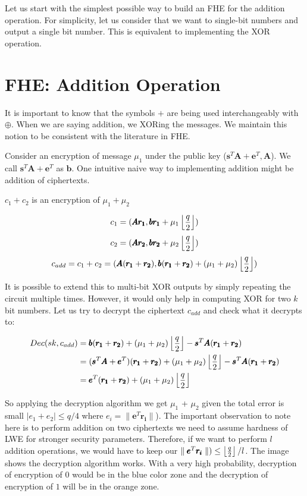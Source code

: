 \documentclass[usletter]{article}
\begin{document}
Let us start with the simplest possible way to build an FHE for the addition operation. 
For simplicity, let us consider that we want to single-bit numbers and output a single bit number. This is equivalent to implementing the XOR operation. 

\section{FHE: Addition Operation}

\begin{remark}
    It is important to know that the symbols $+$ are being used interchangeably with $\oplus$. When we are saying addition, we XORing the messages. We maintain this notion to be consistent with the literature in FHE.
\end{remark}

Consider an encryption of message $\mu_1$ under the public key ($\pmb{s}^{T}\pmb{A} + \pmb{e}^{T}, \pmb{A}$). We call 
$\pmb{s}^{T}\pmb{A} + \pmb{e}^{T}$ as $\pmb{b}$. One intuitive naive way to implementing addition might be addition of ciphertexts.

\begin{claim}
    $c_1 + c_2$ is an encryption of $\mu_1 + \mu_2$
\end{claim}

$$c_1 = ( \pmb{Ar_1}, \pmb{br_1} + \mu_1\left\lfloor \frac{q}{2} \right\rfloor )$$
$$c_2 = ( \pmb{Ar_2}, \pmb{br_2} + \mu_2\left\lfloor \frac{q}{2} \right\rfloor )$$
$$c_{add} = c_1 + c_2 = ( \pmb{A}(\pmb{r_1} + \pmb{r_2}), \pmb{b}(\pmb{r_1} +\pmb{r_2}) + (\mu_1 + \mu_2)\left\lfloor \frac{q}{2} \right\rfloor )$$

It is possible to extend this to multi-bit XOR outputs by simply repeating the circuit multiple times. However, it would only help in computing XOR for two $k$ bit numbers. 
Let us try to decrypt the ciphertext $c_{add}$ and check what it decrypts to:

\begin{align*}
Dec(sk,c_{add})
&= \pmb{b}(\pmb{r_1} +\pmb{r_2}) + (\mu_1 + \mu_2)\left\lfloor \frac{q}{2} \right\rfloor-\pmb{s}^T\pmb{A}(\pmb{r_1} + \pmb{r_2})\\
&=(\pmb{s}^{T}\pmb{A} + \pmb{e}^{T})(\pmb{r_1} +\pmb{r_2}) + (\mu_1 + \mu_2)\left\lfloor \frac{q}{2} \right\rfloor-\pmb{s}^T\pmb{A}(\pmb{r_1} + \pmb{r_2})\\
&=\pmb{e}^{T}(\pmb{r_1} +\pmb{r_2}) + (\mu_1 + \mu_2)\left\lfloor \frac{q}{2} \right\rfloor
\end{align*}


So applying the decryption algorithm we get $\mu_1$ + $\mu_2$ given the total error
is small $|e_1 +e_2| \leq q/4$ where $e_i=\parallel\pmb{e}^{T}\pmb{r_i}\parallel$). The important observation to note here is to perform addition on 
two ciphertexts we need to assume hardness of LWE for stronger security parameters. 
Therefore, if we want to perform $l$ addition operations, we would have to keep our $\parallel\pmb{e}^{T}\pmb{r_i}\parallel) \leq \left\lfloor \frac{q}{2} \right\rfloor/l$. The image shows the decryption algorithm works. With a very high probability, decryption of encryption of $0$ would be in the blue color zone and the decryption of encryption of $1$ will be in the orange zone.
\end{document}
